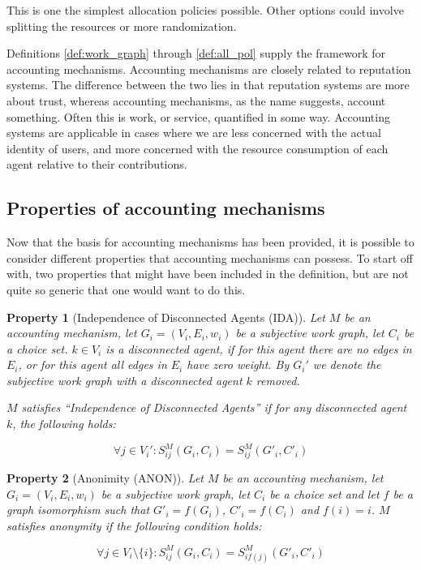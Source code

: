 \documentclass[a4paper,11pt]{book}
\newtheorem{property}{Property}
\theoremstyle{definition}
\begin{document}
This is one the simplest allocation policies possible. Other options could involve  
splitting the resources or more randomization.

Definitions \ref{def:work_graph} through \ref{def:all_pol} supply the framework for accounting
mechanisms. Accounting mechanisms are closely related to reputation systems. The difference
between the two lies in that reputation systems are more about trust, whereas accounting mechanisms,
as the name suggests, account something. Often this is work, or service, quantified in some way.
Accounting systems are applicable in cases where we are less concerned with the actual identity
of users, and more concerned with the resource consumption of each agent relative to their contributions.

\subsection{Properties of accounting mechanisms}

Now that the basis for accounting mechanisms has been provided, it is possible to consider different
properties that accounting mechanisms can possess. To start off with, two properties that might have
been included in the definition, but are not quite so generic that one would want to do this.

\begin{property}[Independence of Disconnected Agents (IDA)]
    Let $M$ be an accounting mechanism, let $G_i = (V_i, E_i, w_i)$ be a subjective work graph, let 
    $C_i$ be a choice set. $k \in V_i$ is a disconnected agent, if for this agent there are no edges
    in $E_i$, or for this agent all edges in $E_i$ have zero weight. By $G_i'$ we denote the subjective
    work graph with a disconnected agent $k$ removed.

    $M$ satisfies ``Independence of Disconnected Agents'' if for any disconnected agent $k$, the following
    holds:

    \begin{equation*}
        \forall j \in V_i' : S_{ij}^M(G_i, C_i) = S_{ij}^M(G'_i, C'_i)
    \end{equation*}
    \label{prop:ida}
\end{property}

\begin{property}[Anonimity (ANON)]
    Let $M$ be an accounting mechanism, let $G_i = (V_i, E_i, w_i)$ be a subjective work graph, let 
    $C_i$ be a choice set and let $f$ be a graph isomorphism such that $G'_i = f(G_i)$, $C'_i = f(C_i)$
    and $f(i) = i$. $M$ satisfies anonymity if the following condition holds:

    \begin{equation*}
        \forall j \in V_i \setminus \{i\} : S_{ij}^M(G_i, C_i) = S_{if(j)}^M(G'_i, C'_i)
    \end{equation*}
    \label{prop:anon}
\end{property}
\end{document}
